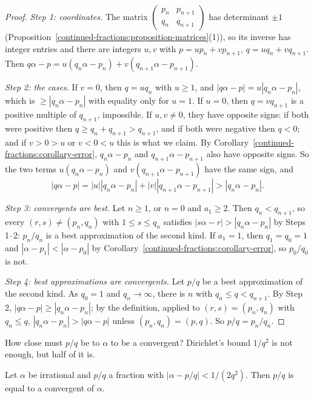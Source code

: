 \begin{proof}
\emph{Step 1: coordinates.} The matrix $\begin{pmatrix} p_n & p_{n+1}\\ q_n & q_{n+1}\end{pmatrix}$ has determinant $\pm 1$ (Proposition~\ref{continued-fractions:proposition-matrices}(1)), so its
inverse has integer entries and there are integers $u, v$ with $p = up_n + vp_{n+1}$, $q = uq_n + vq_{n+1}$. Then $q\alpha - p = u(q_n\alpha - p_n) + v(q_{n+1}\alpha - p_{n+1})$.

\emph{Step 2: the cases.} If $v = 0$, then $q = uq_n$ with $u \geq 1$, and $|q\alpha - p| = u|q_n\alpha - p_n|$, which is $\geq |q_n\alpha - p_n|$ with equality only for $u = 1$. If $u = 0$, then
$q = vq_{n+1}$ is a positive multiple of $q_{n+1}$, impossible. If $u, v \neq 0$, they have opposite signs: if both were positive then $q \geq q_n + q_{n+1} > q_{n+1}$, and if both were negative then
$q < 0$; and if $v > 0 > u$ or $v < 0 < u$ this is what we claim. By Corollary~\ref{continued-fractions:corollary-error}, $q_n\alpha - p_n$ and $q_{n+1}\alpha - p_{n+1}$ also have opposite signs.
So the two terms $u(q_n\alpha - p_n)$ and $v(q_{n+1}\alpha - p_{n+1})$ have the same sign, and
\[
|q\alpha - p| = |u||q_n\alpha - p_n| + |v||q_{n+1}\alpha - p_{n+1}| > |q_n\alpha - p_n|.
\]

\emph{Step 3: convergents are best.} Let $n \geq 1$, or $n = 0$ and $a_1 \geq 2$. Then $q_n < q_{n+1}$, so every $(r, s) \neq (p_n, q_n)$ with $1 \leq s \leq q_n$ satisfies
$|s\alpha - r| > |q_n\alpha - p_n|$ by Steps 1--2: $p_n/q_n$ is a best approximation of the second kind. If $a_1 = 1$, then $q_1 = q_0 = 1$ and $|\alpha - p_1| < |\alpha - p_0|$ by
Corollary~\ref{continued-fractions:corollary-error}, so $p_0/q_0$ is not.

\emph{Step 4: best approximations are convergents.} Let $p/q$ be a best approximation of the second kind. As $q_0 = 1$ and $q_n \to \infty$, there is $n$ with $q_n \leq q < q_{n+1}$. By Step 2,
$|q\alpha - p| \geq |q_n\alpha - p_n|$; by the definition, applied to $(r, s) = (p_n, q_n)$ with $q_n \leq q$, $|q_n\alpha - p_n| > |q\alpha - p|$ unless $(p_n, q_n) = (p, q)$. So $p/q = p_n/q_n$.
\end{proof}

How close must $p/q$ be to $\alpha$ to be a convergent? Dirichlet's bound $1/q^2$ is not enough, but half of it is.

\begin{theorem}[Legendre]\label{continued-fractions:theorem-legendre}
Let $\alpha$ be irrational and $p/q$ a fraction with $|\alpha - p/q| < 1/(2q^2)$. Then $p/q$ is equal to a convergent of $\alpha$.
\end{theorem}

